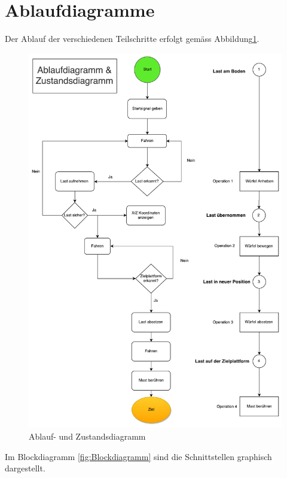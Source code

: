 \documentclass[a4paper]{report}
\begin{document}
\newpage
\section{Ablaufdiagramme}
\label{sec:Ablaufdiagramme}
Der Ablauf der verschiedenen Teilschritte erfolgt gemäss  Abbildung\ref{fig:Ablaufdiagramm}.

\begin{figure}[h!]
	\includegraphics[keepaspectratio,width=\textwidth]{Ablaufdiagramm}
	\caption{Ablauf- und Zustandsdiagramm}
	\label{fig:Ablaufdiagramm}
\end{figure}

Im Blockdiagramm \ref{fig:Blockdiagramm} sind die Schnittstellen graphisch dargestellt.
\end{document}
